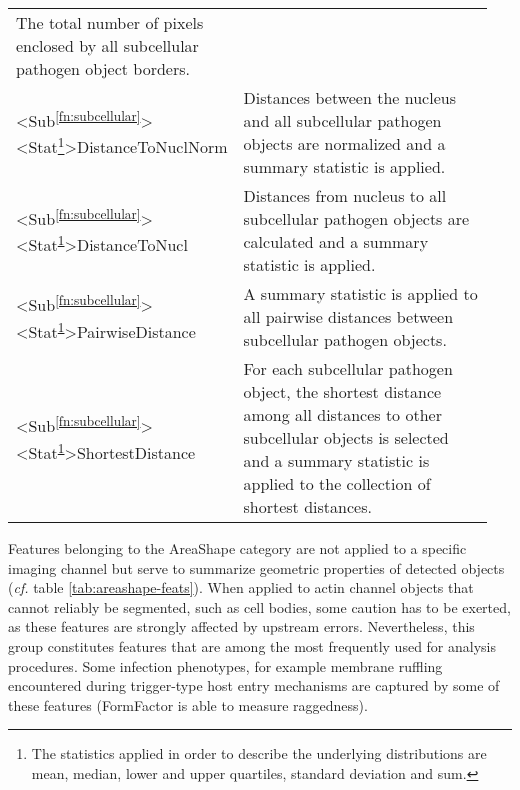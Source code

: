 \begin{table}
\begin{minipage}{\textwidth}
\begin{tabular}{L{0.25\linewidth}L{0.7\linewidth}}
      The total number of pixels enclosed by all subcellular pathogen object borders. \\
    <Sub\textsuperscript{\ref{fn:subcellular}}><Stat\footnote{\label{fn:statistics} The statistics applied in order to describe the underlying distributions are mean, median, lower and upper quartiles, standard deviation and sum.}>Distance\-ToNuclNorm &
      Distances between the nucleus and all subcellular pathogen objects are normalized and a summary statistic is applied. \\
    <Sub\textsuperscript{\ref{fn:subcellular}}><Stat\textsuperscript{\ref{fn:statistics}}>Distance\-ToNucl &
      Distances from nucleus to all subcellular pathogen objects are calculated and a summary statistic is applied.\\
    <Sub\textsuperscript{\ref{fn:subcellular}}><Stat\textsuperscript{\ref{fn:statistics}}>Pairwise\-Distance &
      A summary statistic is applied to all pairwise distances between subcellular pathogen objects. \\
    <Sub\textsuperscript{\ref{fn:subcellular}}><Stat\textsuperscript{\ref{fn:statistics}}>Shortest\-Distance &
      For each subcellular pathogen object, the shortest distance among all distances to other subcellular objects is selected and a summary statistic is applied to the collection of shortest distances. \\
  \end{tabular}
  \end{minipage}
\end{table}

Features belonging to the AreaShape category are not applied to a specific imaging channel but serve to summarize geometric properties of detected objects (\textit{cf.} table \ref{tab:areashape-feats}). When applied to actin channel objects that cannot reliably be segmented, such as cell bodies, some caution has to be exerted, as these features are strongly affected by upstream errors. Nevertheless, this group constitutes features that are among the most frequently used for analysis procedures. Some infection phenotypes, for example membrane ruffling encountered during trigger-type host entry mechanisms are captured by some of these features (FormFactor is able to measure raggedness).

